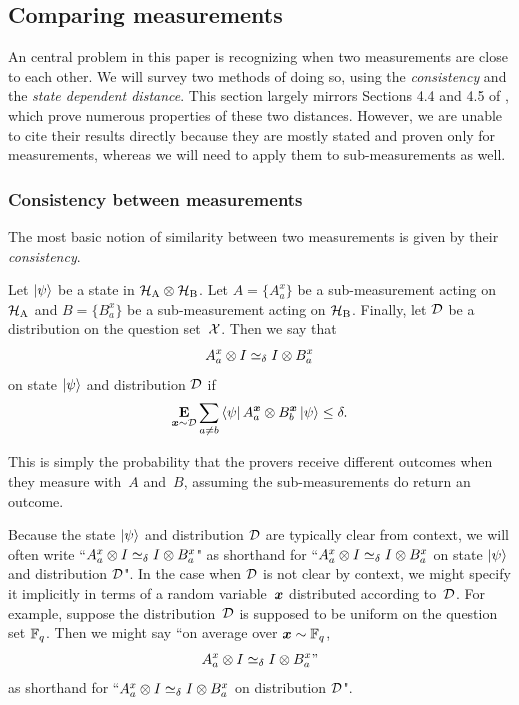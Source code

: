 \subsection{Comparing measurements}
\label{sec:comparing-measurements}

An central problem in this paper is recognizing when two measurements are close to each other. 
We will survey two methods of doing so,
using the \emph{consistency} and the \emph{state dependent distance}.
This section largely mirrors Sections 4.4 and 4.5 of \cite{NW19},
which prove numerous properties of these two distances.
However, we are unable to cite their results directly
because they are mostly stated and proven only for measurements,
whereas we will need to apply them to sub-measurements as well.

\subsubsection{Consistency between measurements}

The most basic notion of similarity between two measurements is given by their \emph{consistency}.

\begin{definition}[Consistency]\label{def:simeq}
Let $\ket{\psi}$ be a state in $\mathcal{H}_{\mathrm{A}} \otimes \mathcal{H}_{\mathrm{B}}$.
Let $A = \{A^x_a\}$ be a sub-measurement acting on $\mathcal{H}_{\mathrm{A}}$
and $B = \{B^x_a\}$ be a sub-measurement acting on $\mathcal{H}_{\mathrm{B}}$.
Finally, let $\mathcal{D}$ be a distribution on the question set~$\mathcal{X}$.
Then we say that
 \begin{equation*}
 A^x_a \otimes I \simeq_{\delta} I \otimes B^x_a
 \end{equation*}
  on state $\ket{\psi}$ and distribution $\mathcal{D}$ if
  \begin{equation}\label{eq:no-big-Oh}
  \mathop{\bf E\/}_{{\boldsymbol{x}} \sim \mathcal{D}} \sum_{a \neq b} \bra{\psi} A^{{\boldsymbol{x}}}_a \otimes B^{{\boldsymbol{x}}}_b
    \ket{\psi} \leq \delta.
    \end{equation}
\end{definition}

This is simply the probability that the provers receive different outcomes
when they measure with~$A$ and~$B$,
assuming the sub-measurements do return an outcome.

\begin{notation}
Because the state $\ket{\psi}$ and distribution $\mathcal{D}$ are typically clear from context,
we will often write ``$ A^x_a \otimes I \simeq_{\delta} I \otimes B^x_a$"
as shorthand for ``$ A^x_a \otimes I \simeq_{\delta} I \otimes B^x_a$ on state $\ket{\psi}$ and distribution $\mathcal{D}$".
In the case when $\mathcal{D}$ is not clear by context,
we might specify it implicitly in terms of a random variable~${\boldsymbol{x}}$ distributed according to~$\mathcal{D}$.
For example, suppose the distribution~$\mathcal{D}$ is supposed to be uniform on the question set $\mathbb F_q$.
Then we might say ``on average over ${\boldsymbol{x}} \sim \mathbb F_q$,
\begin{equation*}
A^x_a \otimes I \simeq_{\delta} I \otimes B^x_a"
\end{equation*}
as shorthand for ``$ A^x_a \otimes I \simeq_{\delta} I \otimes B^x_a$ on distribution $\mathcal{D}$".
\end{notation}

